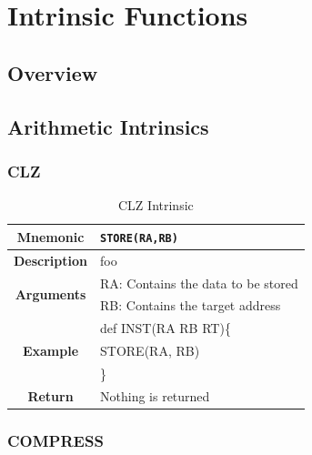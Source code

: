 \documentclass{article}
\begin{document}
\clearpage
\section{Intrinsic Functions}
\label{sec:IntrinsicFunctions}

\subsection{Overview}
\label{sec:IntrinsicOverview}

\subsection{Arithmetic Intrinsics}
\label{sec:ArithIntrinsics}

\subsubsection{CLZ}
\label{sec:CLZ}

\begin{table}[h]
\begin{center}
\caption{CLZ Intrinsic}
\vspace{0.125in}
\label{tab:CLZIntrinsic}
\begin{tabular}{|c|l|}
\hline
\textbf{Mnemonic} & \texttt{STORE(RA,RB)}\\
\hline
\textbf{Description} & foo\\
\hline
\multirow{2}{*}{\textbf{Arguments}} & RA: Contains the data to be stored\\
                          			     & RB: Contains the target address \\
\hline
\multirow{3}{*}{\textbf{Example}} & def INST(RA RB RT)\{\\
                          			  &   STORE(RA, RB)\\
                                                    & \}\\
\hline
\textbf{Return} & Nothing is returned\\                                                    
\hline
\end{tabular}
\end{center}
\end{table}

\clearpage
\subsubsection{COMPRESS}
\label{sec:COMPRESS}
\end{document}
